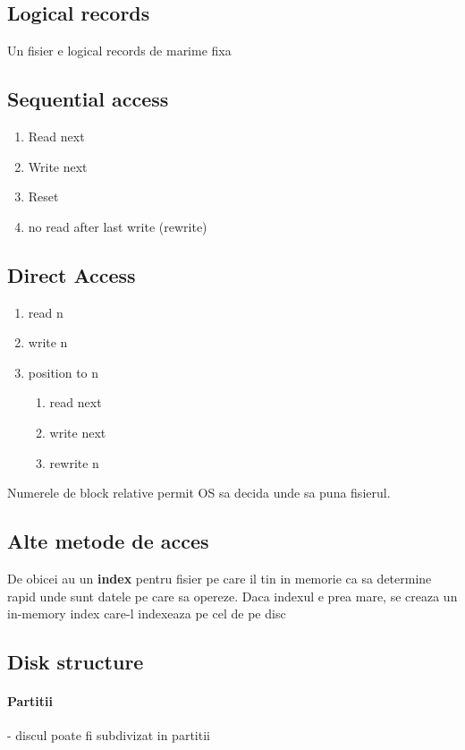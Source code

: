\documentclass{article}
\begin{document}
\subsection*{Logical records}
Un fisier e logical records de marime fixa

\subsection*{Sequential access}
\begin{enumerate}
    \item Read next
    \item Write next
    \item Reset
    \item no read after last write (rewrite)
\end{enumerate}

\subsection*{Direct Access}
\begin{enumerate}
    \item read n
    \item write n
    \item position to n
    \begin{enumerate}
        \item read next
        \item write next
        \item rewrite n
    \end{enumerate}
\end{enumerate}

Numerele de block relative permit OS sa decida unde sa puna fisierul.

\subsection*{Alte metode de acces}
De obicei au un \textbf{index} pentru fisier pe care il tin in memorie ca sa determine rapid unde sunt datele pe care sa opereze. Daca indexul e prea mare, se creaza un in-memory index care-l indexeaza pe cel de pe disc

\subsection*{Disk structure}
\paragraph*{Partitii} - discul poate fi subdivizat in partitii
\end{document}
